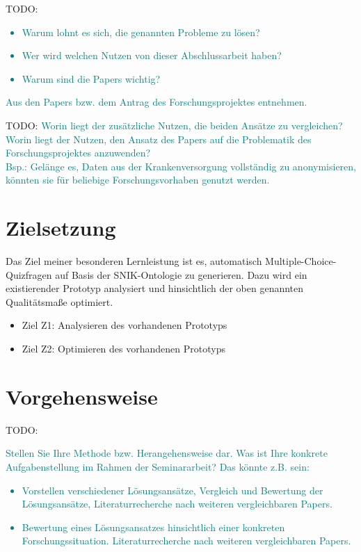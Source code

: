 \documentclass[headsepline,titlepage,ngerman,twoside,12pt]{report}
\newcommand\todo[1]{TODO: \textcolor{teal}{#1}}
\begin{document}
\todo{
\begin{itemize}
\item Warum lohnt es sich, die genannten Probleme zu lösen?
\item Wer wird welchen Nutzen von dieser Abschlussarbeit haben?
\item Warum sind die Papers wichtig?
\end{itemize}
Aus den Papers bzw. dem Antrag des Forschungsprojektes entnehmen.
}
\todo{
Worin liegt der zusätzliche Nutzen, die beiden Ansätze zu vergleichen? Worin liegt der Nutzen, den Ansatz des Papers auf die Problematik des Forschungsprojektes anzuwenden?\\
Bsp.: Gelänge es, Daten aus der Krankenversorgung vollständig zu anonymisieren, könnten sie für beliebige Forschungsvorhaben genutzt werden.
}

\section{Zielsetzung}
\label{sec:Ziele}
Das Ziel meiner besonderen Lernleistung ist es, automatisch Multiple-Choice-Quizfragen auf Basis der SNIK-Ontologie zu generieren. 
Dazu wird ein existierender Prototyp analysiert und hinsichtlich der oben genannten Qualitätsmaße optimiert.
\begin{itemize}
\item Ziel Z1:  Analysieren des vorhandenen Prototyps
\item Ziel Z2:  Optimieren des vorhandenen Prototyps
\end{itemize}

\section{Vorgehensweise}
\label{sec:Vorgehen}
\todo{
Stellen Sie Ihre Methode bzw. Herangehensweise dar.
Was ist Ihre konkrete Aufgabenstellung im Rahmen der Seminararbeit? Das könnte z.B. sein:
\begin{itemize}
\item Vorstellen verschiedener Lösungsansätze, Vergleich und Bewertung der Lösungsansätze, Literaturrecherche nach weiteren vergleichbaren Papers.
\item Bewertung eines Lösungsansatzes hinsichtlich einer konkreten Forschungssituation.
Literaturrecherche nach weiteren vergleichbaren Papers.
\end{itemize}
}
\end{document}
